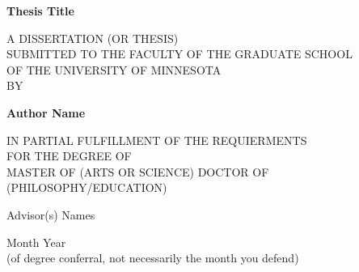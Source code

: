 %
%
%
% 

   \begin{center}
   \begin{spacing}{1}
        \vspace*{1cm}
            
        \Huge
        \textbf{Thesis Title}
            
        \vspace{1.5cm}
        \vfill
        \large
        A DISSERTATION (OR THESIS)\\
        SUBMITTED TO THE FACULTY OF THE GRADUATE SCHOOL\\
        OF THE UNIVERSITY OF MINNESOTA\\
        BY
            
        \textbf{Author Name}
        
        \vfill
        
        IN PARTIAL FULFILLMENT OF THE REQUIERMENTS\\
        FOR THE DEGREE OF\\
        MASTER OF (ARTS OR SCIENCE) DOCTOR OF (PHILOSOPHY/EDUCATION)
            
        \vfill
            
        \vspace{0.8cm}
            
        \Large
        Advisor(s) Names 
        
        \vspace{0.8cm}
        
        Month Year\\ 
        (of degree conferral, not necessarily the month you defend) 
    \end{spacing}        
    \end{center}

	
	